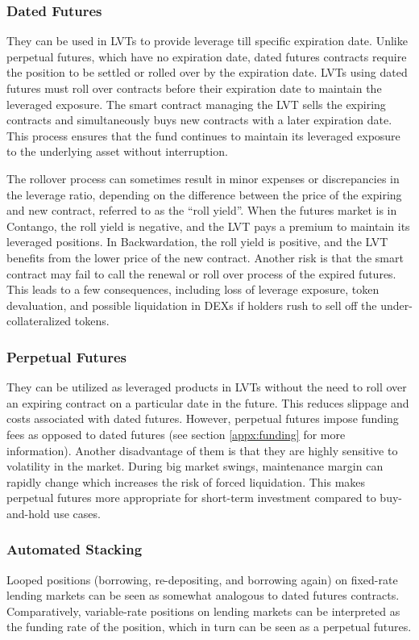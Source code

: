 \subsubsection{Dated Futures}
They can be used in LVTs to provide leverage till specific expiration date. Unlike perpetual futures, which have no expiration date, dated futures contracts require the position to be settled or rolled over by the expiration date. LVTs using dated futures must roll over contracts before their expiration date to maintain the leveraged exposure. The smart contract managing the LVT sells the expiring contracts and simultaneously buys new contracts with a later expiration date. This process ensures that the fund continues to maintain its leveraged exposure to the underlying asset without interruption. 

The rollover process can sometimes result in minor expenses or discrepancies in the leverage ratio, depending on the difference between the price of the expiring and new contract, referred to as the ``roll yield''. When the futures market is in Contango, the roll yield is negative, and the LVT pays a premium to maintain its leveraged positions. In Backwardation, the roll yield is positive, and the LVT benefits from the lower price of the new contract. Another risk is that the smart contract may fail to call the renewal or roll over process of the expired futures. This leads to a few consequences, including loss of leverage exposure, token devaluation, and possible liquidation in DEXs if holders rush to sell off the under-collateralized tokens.

\subsubsection{Perpetual Futures}
They can be utilized as leveraged products in LVTs without the need to roll over an expiring contract on a particular date in the future. This reduces slippage and costs associated with dated futures. However, perpetual futures impose funding fees as opposed to dated futures (see section \ref{appx:funding} for more information). Another disadvantage of them is that they are highly sensitive to volatility in the market. During big market swings, maintenance margin can rapidly change which increases the risk of forced liquidation. This makes perpetual futures more appropriate for short-term investment compared to buy-and-hold use cases.

\subsubsection{Automated Stacking}\label{appx:looping}
Looped positions (\ie borrowing, re-depositing, and borrowing again) on fixed-rate lending markets can be seen as somewhat analogous to dated futures contracts. Comparatively, variable-rate positions on lending markets can be interpreted as the funding rate of the position, which in turn can be seen as a perpetual futures.

